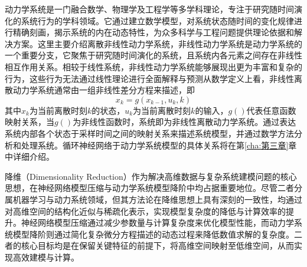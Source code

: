 动力学系统是一门融合数学、物理学及工程学等多学科理论，专注于研究随时间演化的系统行为的学科领域。它通过建立数学模型，对系统状态随时间的变化规律进行精确刻画，揭示系统的内在动态特性，为众多科学与工程问题提供理论依据和解决方案。这里主要介绍离散非线性动力学系统，非线性动力学系统是动力学系统的一个重要分支，它聚焦于研究随时间演化的系统，且系统内各元素之间存在非线性相互作用关系。相较于线性系统，非线性动力学系统能够展现出更为丰富和复杂的行为，这些行为无法通过线性理论进行全面解释与预测从数学定义上看，非线性离散动力学系统通常由一组非线性差分方程来描述，即
\begin{equation}
  \label{eq:discrete}
  {x_k} = g({x_{k - 1}},{u_k},k)
\end{equation}
其中$x_k$为当前离散时刻$k$的状态，$u_k$为当前离散时刻$k$的输入，$g()$代表任意函数映射关系，当$g()$为非线性函数时，系统即为非线性离散动力学系统。通过表达系统内部各个状态于采样时间之间的映射关系来描述系统模型，并通过数学方法分析和处理系统。循环神经网络于动力学系统模型的具体关系将在第\ref{cha:第三章}章中详细介绍。

降维（Dimensionality Reduction）作为解决高维数据与复杂系统建模问题的核心思想，在神经网络模型压缩与动力学系统模型降阶中均占据重要地位。尽管二者分属机器学习与动力系统领域，但其方法论在降维思想上具有深刻的一致性，均通过对高维空间的结构化近似与稀疏化表示，实现模型复杂度的降低与计算效率的提升。神经网络模型压缩通过减少参数量与计算复杂度来优化模型性能，而动力学系统模型降阶则通过简化复杂微分方程描述的动态过程来降低数值求解的复杂度。二者的核心目标均是在保留关键特征的前提下，将高维空间映射至低维空间，从而实现高效建模与计算。

